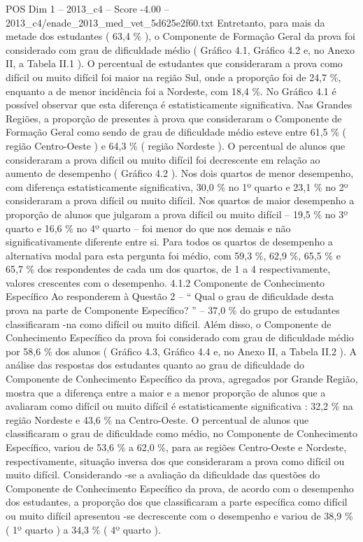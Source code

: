 \begin{textsample}{POS Dim 1 – 2013\_c4 – Score -4.00 – 2013\_c4/enade\_2013\_med\_vet\_5d625e2f60.txt}
Entretanto, para mais da metade dos estudantes ( 63,4 \% ), o Componente de Formação Geral da prova foi considerado com grau de dificuldade médio ( Gráfico 4.1, Gráfico 4.2 e, no Anexo II, a Tabela II.1 ).
O percentual de estudantes que consideraram a prova como difícil ou muito difícil foi maior na região Sul, onde a proporção foi de 24,7 \%, enquanto a de menor incidência foi a Nordeste, com 18,4 \%.
No Gráfico 4.1 é possível observar que esta diferença é estatisticamente significativa.
Nas Grandes Regiões, a proporção de presentes à prova que consideraram o Componente de Formação Geral como sendo de grau de dificuldade médio esteve entre 61,5 \% ( região Centro-Oeste ) e 64,3 \% ( região Nordeste ).
O percentual de alunos que consideraram a prova difícil ou muito difícil foi decrescente em relação ao aumento de desempenho ( Gráfico 4.2 ).
Nos dois quartos de menor desempenho, com diferença estatisticamente significativa, 30,0 \% no 1º quarto e 23,1 \% no 2º consideraram a prova difícil ou muito difícil.
Nos quartos de maior desempenho a proporção de alunos que julgaram a prova difícil ou muito difícil – 19,5 \% no 3º quarto e 16,6 \% no 4º quarto – foi menor do que nos demais e não significativamente diferente entre si.
Para todos os quartos de desempenho a alternativa modal para esta pergunta foi médio, com 59,3 \%, 62,9 \%, 65,5 \% e 65,7 \% dos respondentes de cada um dos quartos, de 1 a 4 respectivamente, valores crescentes com o desempenho. 4.1.2 Componente de Conhecimento Específico Ao responderem à Questão 2 – “ Qual o grau de dificuldade desta prova na parte de Componente Específico? ” – 37,0 \% do grupo de estudantes classificaram -na como difícil ou muito difícil.
Além disso, o Componente de Conhecimento Específico da prova foi considerado com grau de dificuldade médio por 58,6 \% dos alunos ( Gráfico 4.3, Gráfico 4.4 e, no Anexo II, a Tabela II.2 ).
A análise das respostas dos estudantes quanto ao grau de dificuldade do Componente de Conhecimento Específico da prova, agregados por Grande Região, mostra que a diferença entre a maior e a menor proporção de alunos que a avaliaram como difícil ou muito difícil é estatisticamente significativa : 32,2 \% na região Nordeste e 43,6 \% na Centro-Oeste.
O percentual de alunos que classificaram o grau de dificuldade como médio, no Componente de Conhecimento Específico, variou de 53,6 \% a 62,0 \%, para as regiões Centro-Oeste e Nordeste, respectivamente, situação inversa dos que consideraram a prova como difícil ou muito difícil.
Considerando -se a avaliação da dificuldade das questões do Componente de Conhecimento Específico da prova, de acordo com o desempenho dos estudantes, a proporção dos que classificaram a parte específica como difícil ou muito difícil apresentou -se decrescente com o desempenho e variou de 38,9 \% ( 1º quarto ) a 34,3 \% ( 4º quarto ).

\end{textsample}
